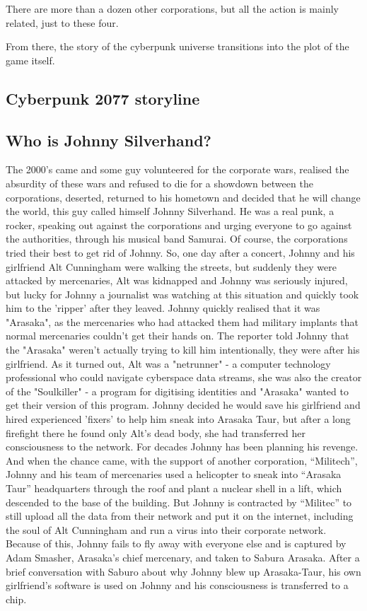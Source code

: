 \documentclass[10pt,twoside,english,a4paper]{article}
\begin{document}
There are more than a dozen other corporations, but all the action is mainly related, just to these four.
 
From there, the story of the cyberpunk universe transitions into the plot of the game itself.

\subsection{Cyberpunk 2077 storyline} \label{storyline}
\subsection{Who is Johnny Silverhand?}\label{johnny}
	The 2000's came and some guy volunteered for the corporate wars, realised the absurdity of these wars and refused to die for a showdown between the corporations, deserted, returned to his hometown and decided that he will change the world, this guy called himself Johnny Silverhand. He was a real punk, a rocker, speaking out against the corporations and urging everyone to go against the authorities, through his musical band Samurai. Of course, the corporations tried their best to get rid of Johnny.
	So, one day after a concert, Johnny and his girlfriend Alt Cunningham were walking the streets, but suddenly they were attacked by mercenaries, Alt was kidnapped and Johnny was seriously injured, but lucky for Johnny a journalist was watching at this situation and quickly took him to the 'ripper' after they leaved. Johnny quickly realised that it was "Arasaka", as the mercenaries who had attacked them had military implants that normal mercenaries couldn't get their hands on. The reporter told Johnny that the "Arasaka" weren't actually trying to kill him intentionally, they were after his girlfriend. As it turned out, Alt was a "netrunner" - a computer technology professional who could navigate cyberspace data streams, she was also the creator of the "Soulkiller" - a program for digitising identities and "Arasaka" wanted to get their version of this program. Johnny decided he would save his girlfriend and hired experienced 'fixers' to help him sneak into Arasaka Taur, but after a long firefight there he found only Alt's dead body, she had transferred her consciousness to the network.
For decades Johnny has been planning his revenge. And when the chance came, with the support of another corporation, “Militech”, Johnny and his team of mercenaries used a helicopter to sneak into “Arasaka Taur” headquarters through the roof and plant a nuclear shell in a lift, which descended to the base of the building. But Johnny is contracted by “Militec” to still upload all the data from their network and put it on the internet, including the soul of Alt Cunningham and run a virus into their corporate network. Because of this, Johnny fails to fly away with everyone else and is captured by Adam Smasher, Arasaka's chief mercenary, and taken to Sabura Arasaka. After a brief conversation with Saburo about why Johnny blew up Arasaka-Taur, his own girlfriend's software is used on Johnny and his consciousness is transferred to a chip.
\end{document}

